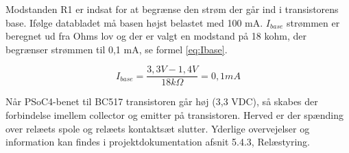 Modstanden R1 er indsat for at begrænse den strøm der går ind i transistorens base. Ifølge databladet må basen højst belastet med 100 mA. $I_{base}$ strømmen er beregnet ud fra Ohms lov og der er valgt en modstand på 18 kohm, der begrænser strømmen til 0,1 mA, se formel \ref{eq:Ibase}.

\begin{equation} 
I_{base} = \frac{3,3V - 1,4V}{18k\Omega} = 0,1mA
\label{eq:Ibase}
\end{equation} 

Når PSoC4-benet til BC517 transistoren går høj (3,3 VDC), så skabes der forbindelse imellem collector og emitter på transistoren. Herved er der spænding over relæets spole og relæets kontaktsæt slutter. Yderlige overvejelser og information kan findes i projektdokumentation afsnit 5.4.3, Relæstyring.
